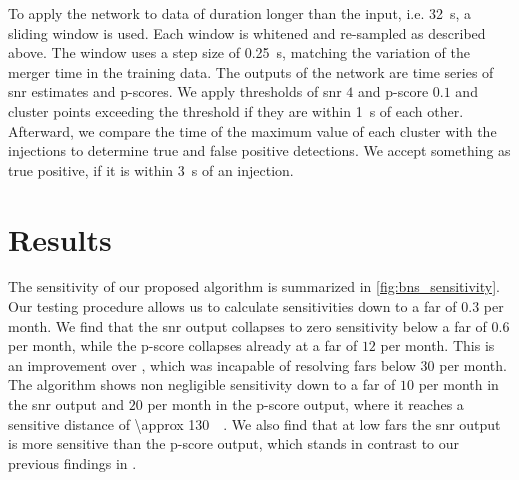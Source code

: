 To apply the network to data of duration longer than the input, i.e. \SI{32}{\second}, a sliding window is used. Each window is whitened and re-sampled as described above. The window uses a step size of \SI{0.25}{\second}, matching the variation of the merger time in the training data. The outputs of the network are time series of \acrshort{snr} estimates and p-scores. We apply thresholds of \acrshort{snr} $4$ and p-score $0.1$ and cluster points exceeding the threshold if they are within \SI{1}{\second} of each other. Afterward, we compare the time of the maximum value of each cluster with the injections to determine true and false positive detections. We accept something as true positive, if it is within \SI{3}{\second} of an injection.

\section{Results}
The sensitivity of our proposed algorithm is summarized in \autoref{fig:bns_sensitivity}. Our testing procedure allows us to calculate sensitivities down to a \acrshort{far} of $0.3$ per month. We find that the \acrshort{snr} output collapses to zero sensitivity below a \acrshort{far} of $0.6$ per month, while the p-score collapses already at a \acrshort{far} of $12$ per month. This is an improvement over \cite{Schaefer:2019:MSC}, which was incapable of resolving \acrshort{far}s below $30$ per month. The algorithm shows non negligible sensitivity down to a \acrshort{far} of $10$ per month in the \acrshort{snr} output and $20$ per month in the p-score output, where it reaches a sensitive distance of \SI[parse-numbers=false]{\approx 130}{\mega\parsec}. We also find that at low \acrshort{far}s the \acrshort{snr} output is more sensitive than the p-score output, which stands in contrast to our previous findings in \cite{Schaefer:2019:MSC}.
